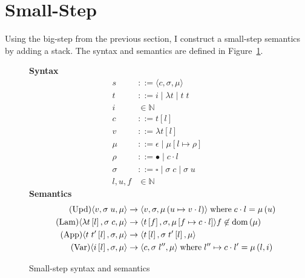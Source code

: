 \section{Small-Step \ce} \label{sec:mach}
Using the big-step \ce from the previous section, I construct a small-step
semantics by adding a stack.  The syntax and semantics are defined in
Figure~\ref{fig:cesm}. 

\begin{figure}
\textbf{Syntax}
\begin{align*}
\tag{State} s &::= \langle c, \sigma, \mu \rangle \\
\tag{Term} t &::= i \; | \; \lambda t \; | \; t \; t  \\
\tag{Variable} i &\in \mathbb{N}  \\
\tag{Closure} c &::= t \left[l\right] \\
\tag{Value} v &::= \lambda t\left[l\right] \\
\tag{Heap} \mu &::= \epsilon \; | \; \mu \left[ l \mapsto \rho \right] \\
\tag{Environment} \rho &::= \bullet \; | \; c \cdot l \\
\tag{Stack} \sigma &::= \square \; | \; \sigma \; c \;  | \; \sigma \; u \\
\tag{Location} l,u,f &\in \mathbb{N}
\end{align*}
\textbf{Semantics}
\begin{align*}
\tag{Upd}
\langle v,  \sigma \; u , \mu \rangle 
  &\rightarrow
\langle v, \sigma, \mu\left(u \mapsto v \cdot l\right) \rangle  
\; \textnormal{where} \; c \cdot l = \mu\left(u\right) \\
\tag{Lam}
\langle \lambda t\left[l\right], \sigma \; c, \mu \rangle 
  &\rightarrow
\langle t\left[f\right], \sigma, \mu\left[f \mapsto c \cdot l\right]\rangle f
\not \in \textnormal{dom}\left(\mu\right)  \\
\tag{App}
\langle t \; t'\left[l\right], \sigma, \mu \rangle
  &\rightarrow
\langle t\left[l\right], \sigma \; t'\left[l\right], \mu \rangle \\
\tag{Var}
\langle i\left[l\right], \sigma, \mu \rangle
  &\rightarrow
\langle c, \sigma \; l'', \mu \rangle
\; \textnormal{where} \; l'' \mapsto c \cdot l' = \mu\left(l, i\right)
\end{align*}
\caption{Small-step \ce syntax and semantics}
\label{fig:cesm}
\end{figure}

